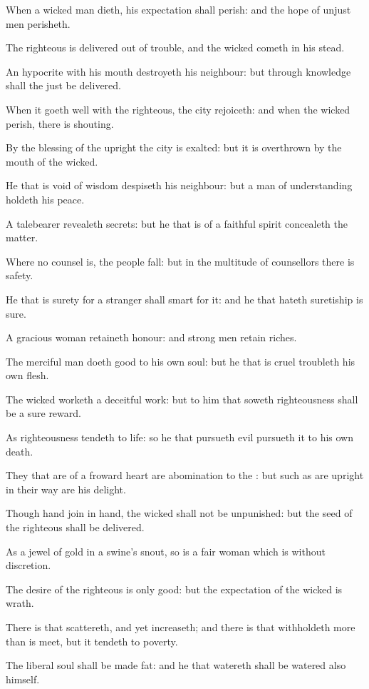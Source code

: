 \Verse When a wicked man dieth, his expectation shall perish: and the hope of unjust men perisheth.

\Verse The righteous is delivered out of trouble, and the wicked cometh in his stead.

\Verse An hypocrite with his mouth destroyeth his neighbour: but through knowledge shall the just be delivered.

\Verse When it goeth well with the righteous, the city rejoiceth: and when the wicked perish, there is shouting.

\Verse By the blessing of the upright the city is exalted: but it is overthrown by the mouth of the wicked.

\Verse He that is void of wisdom despiseth his neighbour: but a man of understanding holdeth his peace.

\Verse A talebearer revealeth secrets: but he that is of a faithful spirit concealeth the matter.

\Verse Where no counsel is, the people fall: but in the multitude of counsellors there is safety.

\Verse He that is surety for a stranger shall smart for it: and he that hateth suretiship is sure.

\Verse A gracious woman retaineth honour: and strong men retain riches.

\Verse The merciful man doeth good to his own soul: but he that is cruel troubleth his own flesh.

\Verse The wicked worketh a deceitful work: but to him that soweth righteousness shall be a sure reward.

\Verse As righteousness tendeth to life: so he that pursueth evil pursueth it to his own death.

\Verse They that are of a froward heart are abomination to the \LORD: but such as are upright in their way are his delight.

\Verse Though hand join in hand, the wicked shall not be unpunished: but the seed of the righteous shall be delivered.

\Verse As a jewel of gold in a swine's snout, so is a fair woman which is without discretion.

\Verse The desire of the righteous is only good: but the expectation of the wicked is wrath.

\Verse There is that scattereth, and yet increaseth; and there is that withholdeth more than is meet, but it tendeth to poverty.

\Verse The liberal soul shall be made fat: and he that watereth shall be watered also himself.

